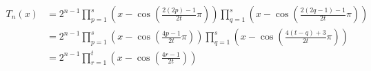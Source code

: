 \begin{equation}
 \begin{split}
 T_{n}(x) &= 2^{n-1}\prod \limits_{p=1}^{s} \left( x - \cos(\frac{2(2p)-1}{2t}\pi) \right)\prod \limits_{q=1}^{s} \left( x - \cos(\frac{2(2q-1)-1}{2t}\pi) \right) \\
 &=  2^{n-1}\prod \limits_{p=1}^{s} \left( x - \cos(\frac{4p-1}{2t}\pi) \right)\prod \limits_{q=1}^{s} \left( x - \cos(\frac{4(t-q)+3}{2t}\pi) \right) \\
 &=  2^{n-1}\prod \limits_{r=1}^{t} \left( x - \cos(\frac{4r-1}{2t}) \right)
  \end{split}
\end{equation}

